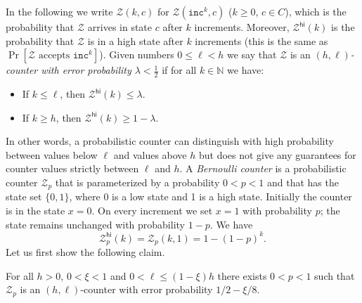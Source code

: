 \documentclass{article}\usepackage[a4paper,margin=20mm]{geometry}
\newcommand{\N}{\mathbb{N}}
\newcommand{\BZ}{\mathcal{Z}}
\renewcommand{\geq}{\geqslant}
\renewcommand{\leq}{\leqslant}
\renewcommand{\ge}{\geq}
\renewcommand{\le}{\leq}
\begin{document}
In the following we write $\BZ(k,c)$ for $\BZ(\mathtt{inc}^k, c)$ ($k \geq 0$, $c \in C$), which is the probability
that $\BZ$ arrives in state $c$ after $k$ increments. Moreover, $\BZ^{\mathsf{hi}}(k)$ is the probability
that $\BZ$ is in a high state after $k$ increments (this is the same as $\Pr[\BZ \text{ accepts } \mathtt{inc}^k]$).  
Given numbers $0 \le \ell < h$ we say that $\BZ$ is an
{\em $(h,\ell)$-counter with error probability $\lambda < \frac{1}{2}$}
if for all $k \in \N$ we have:
\begin{itemize}
	\item If $k \le \ell$, then $\BZ^{\mathsf{hi}}(k) \le \lambda$.
	\item If $k \ge h$, then $\BZ^{\mathsf{hi}}(k)  \ge 1-\lambda$.
\end{itemize}
In other words, a probabilistic counter can distinguish with high probability 
between values below $\ell$ and values above $h$
but does not give any guarantees for counter values strictly between $\ell$ and $h$.
A {\em Bernoulli counter} is a probabilistic counter 
$\BZ_p$ that is parameterized by a probability $0 < p < 1$ and that
has the state set $\{0,1\}$, where 0 is a low state and 1 is a high state.
Initially the counter is in the state $x = 0$.
On every increment we set $x = 1$ with probability $p$;
the state remains unchanged with probability $1-p$.
We have
\[
 \BZ_p^{\mathsf{hi}}(k) = \BZ_p(k,1) = 1-(1-p)^k.
\]
Let us first show the following claim.

\begin{lemma} \label{claim-bernoulli}
	For all $h>0$, $0 < \xi < 1$ and $0 <\ell \le (1-\xi) h$
	there exists $0 < p < 1$ such that $\BZ_p$ is an $(h,\ell)$-counter
	with error probability $1/2 - \xi/8$. 
\end{lemma}
\end{document}
